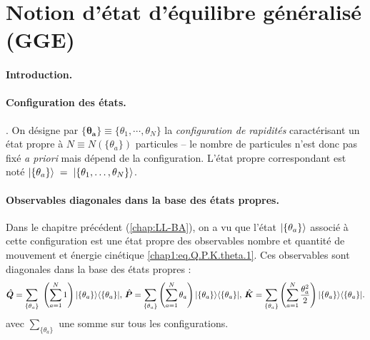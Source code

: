 \section{Notion d’état d’équilibre généralisé (GGE)}

\paragraph{Introduction.}


\paragraph{Configuration des états.}\label{sec:config-etats}.
On désigne par $\boldsymbol{\{ \theta_a \}}\equiv \{ \theta_1 , \cdots , \theta_{N} \}$ la \emph{configuration de rapidités} caractérisant un état propre à $N\!\equiv\!N(\{ \theta_a \})$ particules – le nombre de particules n’est donc pas fixé \emph{a priori} mais dépend de la configuration.  
L’état propre correspondant est noté $\ket{\{ \theta_a \}}\;=\;\ket{\{\theta_1,\dots,\theta_N \}}$.

\paragraph{Observables diagonales dans la base des états propres.}
Dans le chapitre précédent (\ref{chap:LL-BA}), on a vu que l'état $\ket{\{ \theta_a \}}$ associé à cette configuration est une état propre des observables nombre et quantité de mouvement  et  énergie cinétique \eqref{chap1:eq.Q.P.K.theta.1}. Ces observables sont diagonales dans la base des états propres :
\begin{eqnarray}
	\operator{Q}  =  \sum_{ \{\theta_a\} } \left ( \sum_{a = 1}^{N}  1 \right )  \vert \{ \theta_a\}\rangle	\langle \{ \theta_a \}\vert, \, 
	\operator{P}  =  \sum_{\{ \theta_a\}}\left( \sum_{a = 1}^{N}  \theta_a \right )   \vert \{ \theta_a\}\rangle	\langle \{ \theta_a \}\vert,\,\operator{K}  =  \sum_{\{ \theta_a\}}\left ( \sum_{a = 1}^{N} \frac{\theta_a^2}{2} \right )   \vert \{ \theta_a\}\rangle	\langle \{ \theta_a \}\vert.\label{chap.2.gge.1}		
\end{eqnarray}
avec $ \sum_{\{ \theta_a\}}$ une somme sur tous les configurations.\\

